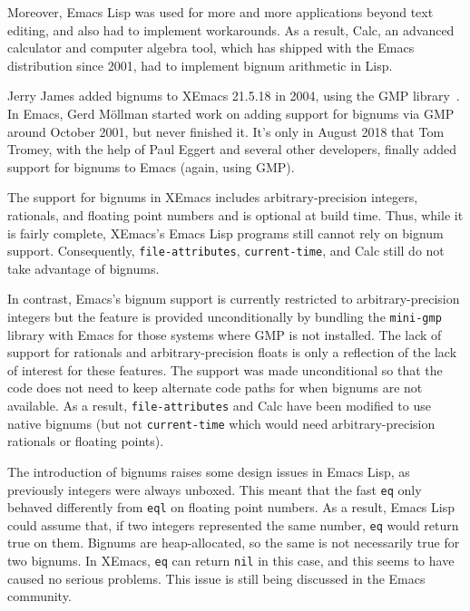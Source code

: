 \documentclass[format=acmsmall, review]{acmart}
\newcommand \Elisp {Emacs Lisp}
\begin{document}
Moreover, \Elisp{} was used for more and more applications beyond
text editing, and also had to implement workarounds.  As a result,
Calc, an advanced calculator and computer algebra tool, which has
shipped with the Emacs distribution since 2001, had to implement
bignum arithmetic in Lisp.

Jerry James added bignums to XEmacs 21.5.18 in 2004, using the GMP
library~\cite{GMP}.  In Emacs, Gerd Möllman started work on adding support
for bignums via GMP around October 2001, but never finished it.  It's only
in August 2018 that Tom Tromey, with the help of Paul Eggert and several
other developers, finally added support for bignums to Emacs (again, using
GMP).

The support for bignums in XEmacs includes arbitrary-precision integers,
rationals, and floating point numbers and is optional at build time. Thus,
while it is fairly complete, XEmacs's \Elisp{} programs still cannot rely on
bignum support.  Consequently, \texttt{file-attributes},
\texttt{current-time}, and Calc still do not take advantage of bignums.

In contrast, Emacs's bignum support is currently restricted to
arbitrary-precision integers but the feature is provided unconditionally by
bundling the \texttt{mini-gmp} library with Emacs for those systems where
GMP is not installed.  The lack of support for rationals and
arbitrary-precision floats is only a reflection of the lack of interest for
these features.  The support was made unconditional so that the code does
not need to keep alternate code paths for when bignums are not available.
As a result, \texttt{file-attributes} and Calc have been modified to use
native bignums (but not \texttt{current-time} which would need
arbitrary-precision rationals or floating points).

The introduction of bignums raises some design issues in \Elisp, as
previously integers were always unboxed.  This meant that the fast
\texttt{eq} only behaved differently from \texttt{eql} on floating point
numbers.  As a result, \Elisp{} could assume that, if two integers
represented the same number, \texttt{eq} would return true on them.
Bignums are heap-allocated, so the same is not necessarily true for two
bignums.  In XEmacs, \texttt{eq} can return \texttt{nil} in this case, and
this seems to have caused no serious problems.
This issue is still being discussed in the Emacs community.


\end{document}
